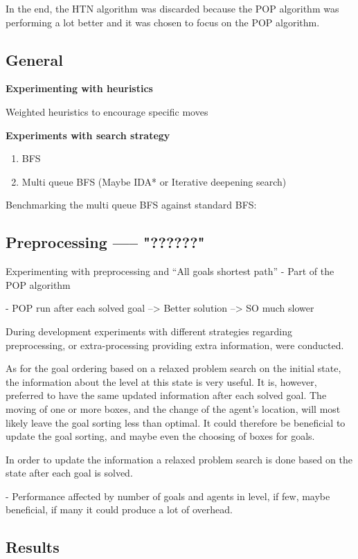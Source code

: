 \documentclass[Main]{subfiles}
\begin{document}
In the end, the HTN algorithm was discarded because the POP algorithm was performing a lot better and it was chosen to focus on the POP algorithm.




\subsection{General} 


\textbf{Experimenting with heuristics}

Weighted heuristics to encourage specific moves





\textbf{Experiments with search strategy}

\begin{enumerate}
    \item BFS 
    \item Multi queue BFS (Maybe IDA* or Iterative deepening search)
\end{enumerate}



Benchmarking the multi queue BFS against standard BFS:





\subsection{Preprocessing ----- "??????" }

Experimenting with preprocessing and ``All goals shortest path'' 
- Part of the POP algorithm

- POP run after each solved goal 
--> Better solution --> SO much slower


During development experiments with different strategies regarding preprocessing, or extra-processing providing extra information, were conducted. 

As for the goal ordering based on a relaxed problem search on the initial state, the information about the level at this state is very useful. It is, however, preferred to have the same updated information after each solved goal. The moving of one or more boxes, and the change of the agent's location, will most likely leave the goal sorting less than optimal. It could therefore be beneficial to update the goal sorting, and maybe even the choosing of boxes for goals. 

In order to update the information a relaxed problem search is done based on the state after each goal is solved. 


- Performance affected by number of goals and agents in level, if few, maybe beneficial, if many it could produce a lot of overhead.






\subsection{Results}
\end{document}
